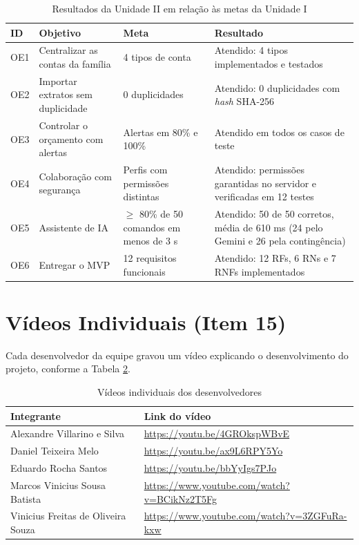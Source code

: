 \documentclass[12pt,oneside,a4paper,article]{abntex2}
\begin{document}
\begin{table}[H]
\centering
\caption{Resultados da Unidade II em relação às metas da Unidade I}
\label{tab:resultados}
\begin{tabularx}{\textwidth}{p{1.1cm}p{4.2cm}p{3.6cm}X}
\toprule
\textbf{ID} & \textbf{Objetivo} & \textbf{Meta} & \textbf{Resultado} \\
\midrule
OE1 & Centralizar as contas da família & 4 tipos de conta & Atendido: 4 tipos implementados e testados \\
OE2 & Importar extratos sem duplicidade & 0 duplicidades & Atendido: 0 duplicidades com \textit{hash} SHA-256 \\
OE3 & Controlar o orçamento com alertas & Alertas em 80\% e 100\% & Atendido em todos os casos de teste \\
OE4 & Colaboração com segurança & Perfis com permissões distintas & Atendido: permissões garantidas no servidor e verificadas em 12 testes \\
OE5 & Assistente de IA & $\ge$ 80\% de 50 comandos em menos de 3 s & Atendido: 50 de 50 corretos, média de 610 ms (24 pelo Gemini e 26 pela contingência) \\
OE6 & Entregar o MVP & 12 requisitos funcionais & Atendido: 12 RFs, 6 RNs e 7 RNFs implementados \\
\bottomrule
\end{tabularx}
\end{table}

\section{Vídeos Individuais (Item 15)}
\label{sec:videos}

Cada desenvolvedor da equipe gravou um vídeo explicando o desenvolvimento do projeto, conforme a Tabela \ref{tab:videos}.

\begin{table}[H]
\centering
\caption{Vídeos individuais dos desenvolvedores}
\label{tab:videos}
\begin{tabularx}{\textwidth}{p{6cm}X}
\toprule
\textbf{Integrante} & \textbf{Link do vídeo} \\
\midrule
Alexandre Villarino e Silva & \url{https://youtu.be/4GROkspWBvE} \\
Daniel Teixeira Melo & \url{https://youtu.be/ax9L6RPY5Yo} \\
Eduardo Rocha Santos & \url{https://youtu.be/bbYyIgs7PJo} \\
Marcos Vinicius Sousa Batista & \url{https://www.youtube.com/watch?v=BCikNz2T5Fg} \\
Vinicius Freitas de Oliveira Souza & \url{https://www.youtube.com/watch?v=3ZGFuRa-kxw} \\
\bottomrule
\end{tabularx}
\end{table}
\end{document}
